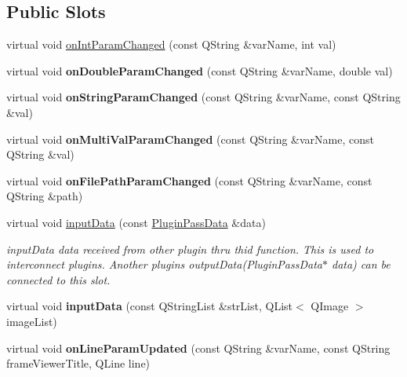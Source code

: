 \subsection*{Public Slots}
\begin{DoxyCompactItemize}
\item 
virtual void \hyperlink{class_nooba_plugin_a_p_i_a1c6dfbd25f56949f058f2ec1c778c255}{on\-Int\-Param\-Changed} (const Q\-String \&var\-Name, int val)
\item 
\hypertarget{class_nooba_plugin_a_p_i_a943eecd58855dce164b2ee772f821cc4}{virtual void {\bfseries on\-Double\-Param\-Changed} (const Q\-String \&var\-Name, double val)}\label{class_nooba_plugin_a_p_i_a943eecd58855dce164b2ee772f821cc4}

\item 
\hypertarget{class_nooba_plugin_a_p_i_a27b9c788c723dfc7f65c89df28fd72f6}{virtual void {\bfseries on\-String\-Param\-Changed} (const Q\-String \&var\-Name, const Q\-String \&val)}\label{class_nooba_plugin_a_p_i_a27b9c788c723dfc7f65c89df28fd72f6}

\item 
\hypertarget{class_nooba_plugin_a_p_i_adc036b89ba60176bb22be9c57ba928dc}{virtual void {\bfseries on\-Multi\-Val\-Param\-Changed} (const Q\-String \&var\-Name, const Q\-String \&val)}\label{class_nooba_plugin_a_p_i_adc036b89ba60176bb22be9c57ba928dc}

\item 
\hypertarget{class_nooba_plugin_a_p_i_a424cc229b473f03569b62c467d593b0a}{virtual void {\bfseries on\-File\-Path\-Param\-Changed} (const Q\-String \&var\-Name, const Q\-String \&path)}\label{class_nooba_plugin_a_p_i_a424cc229b473f03569b62c467d593b0a}

\item 
virtual void \hyperlink{class_nooba_plugin_a_p_i_a1957f0d0dd3820bc612bf718c4563f3c}{input\-Data} (const \hyperlink{class_plugin_pass_data}{Plugin\-Pass\-Data} \&data)
\begin{DoxyCompactList}\small\item\em input\-Data data received from other plugin thru thid function. This is used to interconnect plugins. Another plugins output\-Data(\-Plugin\-Pass\-Data$\ast$ data) can be connected to this slot. \end{DoxyCompactList}\item 
\hypertarget{class_nooba_plugin_a_p_i_a76b29ea195cae378ab04de715212a00e}{virtual void {\bfseries input\-Data} (const Q\-String\-List \&str\-List, Q\-List$<$ Q\-Image $>$ image\-List)}\label{class_nooba_plugin_a_p_i_a76b29ea195cae378ab04de715212a00e}

\item 
\hypertarget{class_nooba_plugin_a_p_i_a312e1f7842db25aed043e8fee07e644f}{virtual void {\bfseries on\-Line\-Param\-Updated} (const Q\-String \&var\-Name, const Q\-String frame\-Viewer\-Title, Q\-Line line)}\label{class_nooba_plugin_a_p_i_a312e1f7842db25aed043e8fee07e644f}

\end{DoxyCompactItemize}
